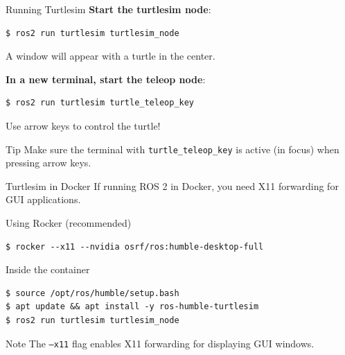 \begin{frame}[fragile]{Running Turtlesim}
    \textbf{Start the turtlesim node}:
    \begin{lstlisting}[language=shell]
$ ros2 run turtlesim turtlesim_node
\end{lstlisting}

    A window will appear with a turtle in the center.

    \vspace{0.5cm}

    \textbf{In a new terminal, start the teleop node}:
    \begin{lstlisting}[language=shell]
$ ros2 run turtlesim turtle_teleop_key
\end{lstlisting}

    Use arrow keys to control the turtle!

    \begin{alertblock}{Tip}
        Make sure the terminal with \texttt{turtle\_teleop\_key} is active (in focus) when pressing arrow keys.
    \end{alertblock}
\end{frame}

\begin{frame}[fragile]{Turtlesim in Docker}
    If running ROS 2 in Docker, you need X11 forwarding for GUI applications.

    \begin{block}{Using Rocker (recommended)}
        \begin{lstlisting}[language=shell]
$ rocker --x11 --nvidia osrf/ros:humble-desktop-full
\end{lstlisting}
    \end{block}

    \begin{block}{Inside the container}
        \begin{lstlisting}[language=shell]
$ source /opt/ros/humble/setup.bash
$ apt update && apt install -y ros-humble-turtlesim
$ ros2 run turtlesim turtlesim_node
\end{lstlisting}
    \end{block}

    \begin{alertblock}{Note}
        The \texttt{--x11} flag enables X11 forwarding for displaying GUI windows.
    \end{alertblock}
\end{frame}

